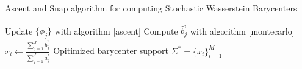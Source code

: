 \begin{algorithm}
    \caption{Ascent and Snap algorithm for computing Stochastic Wasserstein Barycenters}
    \label{ascent_snap}
    \begin{algorithmic}[1]
            \STATE Update $\lbrace \phi_j \rbrace$ with algorithm \ref{ascent} 
            \STATE Compute $\hat{b}_j^i$ with algorithm \ref{montecarlo} 
                \STATE $x_i \gets \frac{\sum_{j=1}^J \hat{b}_j^i }{\sum_{j=1}^{J}\hat{a}_j^i}$ 
            \ENDFOR
        \ENDFOR
        \RETURN Opitimized barycenter support $\Sigma^* = \lbrace x_i \rbrace_{i=1}^M$
    \end{algorithmic}
\end{algorithm}
